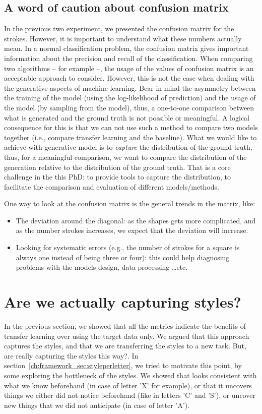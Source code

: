 \subsection{A word of caution about confusion matrix}
\par In the previous two experiment, we presented the confusion matrix for the strokes. However, it is important to understand what these numbers actually mean. In a normal classification problem, the confusion matrix gives important information about the precision and recall of the classification. When comparing two algorithms -- for example --, the usage of the values of confusion matrix is an acceptable approach to consider. However, this is not the case when dealing with the generative aspects of machine learning. Bear in mind the asymmetry between the training of the model (using the log-likelihood of prediction) and the usage of the model (by sampling from the model), thus, a one-to-one comparison between what is generated and the ground truth is not possible or meaningful. A logical consequence for this is that we can not use such a method to compare two models together (i.e., compare transfer learning and the baseline). What we would like to achieve with generative model is to \textit{capture} the distribution of the ground truth, thus, for a meaningful comparison, we want to compare the distribution of the generation relative to the distribution of the ground truth. That is a core challenge in the this PhD: to provide tools to capture the distribution, to facilitate the comparison and evaluation of different models/methods.

\par One way to look at the confusion matrix is the general trends in the matrix, like:
\begin{itemize}
  \item The deviation around the diagonal: as the shapes gets more complicated, and as the number strokes increases, we expect that the deviation will increase.
  \item Looking for systematic errors (e.g., the number of strokes for a square is always one instead of being three or four): this could help diagnosing problems with the models design, data processing \dots etc.
\end{itemize}

\section{Are we actually capturing styles?} \label{ch:seat_sec:rf}
\par In the previous section, we showed that all the metrics indicate the benefits of transfer learning over using the target data only. We argued that this approach captures the styles, and that we are transferring the styles to a new task. But, are really capturing the styles this way?. In section~\ref{ch:framework_sec:styleperletter}, we tried to motivate this point, by some exploring the bottleneck of the styles. We showed that looks consistent with what we know beforehand (in case of letter 'X' for example), or that it uncovers things we either did not notice beforehand (like in letters 'C' and 'S'), or uncover new things that we did not anticipate (in case of letter 'A').

